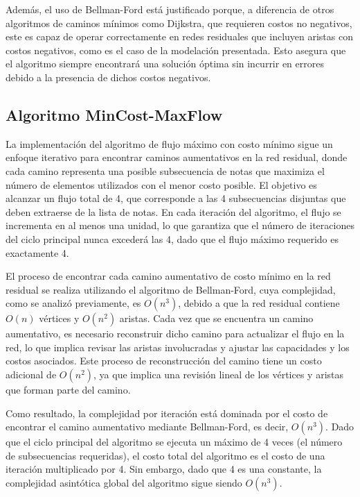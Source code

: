 \documentclass{article}
\begin{document}
Además, el uso de Bellman-Ford está justificado porque, a diferencia de otros algoritmos de caminos mínimos como Dijkstra, que requieren costos no negativos, este es capaz de operar correctamente en redes residuales que incluyen aristas con costos negativos, como es el caso de la modelación presentada. Esto asegura que el algoritmo siempre encontrará una solución óptima sin incurrir en errores debido a la presencia de dichos costos negativos.



\subsection{Algoritmo MinCost-MaxFlow}

La implementación del algoritmo de flujo máximo con costo mínimo sigue un enfoque iterativo para encontrar caminos aumentativos en la red residual, donde cada camino representa una posible subsecuencia de notas que maximiza el número de elementos utilizados con el menor costo posible. El objetivo es alcanzar un flujo total de 4, que corresponde a las 4 subsecuencias disjuntas que deben extraerse de la lista de notas. En cada iteración del algoritmo, el flujo se incrementa en al menos una unidad, lo que garantiza que el número de iteraciones del ciclo principal nunca excederá las 4, dado que el flujo máximo requerido es exactamente 4.

El proceso de encontrar cada camino aumentativo de costo mínimo en la red residual se realiza utilizando el algoritmo de Bellman-Ford, cuya complejidad, como se analizó previamente, es $O(n^3)$, debido a que la red residual contiene $O(n)$ vértices y $O(n^2)$ aristas. Cada vez que se encuentra un camino aumentativo, es necesario reconstruir dicho camino para actualizar el flujo en la red, lo que implica revisar las aristas involucradas y ajustar las capacidades y los costos asociados. Este proceso de reconstrucción del camino tiene un costo adicional de $O(n^2)$, ya que implica una revisión lineal de los vértices y aristas que forman parte del camino.

Como resultado, la complejidad por iteración está dominada por el costo de encontrar el camino aumentativo mediante Bellman-Ford, es decir, $O(n^3)$. Dado que el ciclo principal del algoritmo se ejecuta un máximo de 4 veces (el número de subsecuencias requeridas), el costo total del algoritmo es el costo de una iteración multiplicado por 4. Sin embargo, dado que 4 es una constante, la complejidad asintótica global del algoritmo sigue siendo $O(n^3)$.
\end{document}
